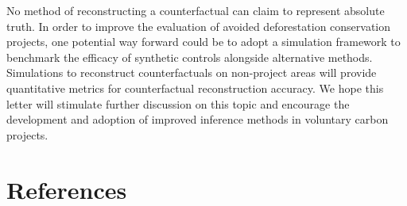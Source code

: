 \documentclass[
  number,
  3p]{elsarticle}
\begin{document}
No method of reconstructing a counterfactual can claim to represent
absolute truth. In order to improve the evaluation of avoided
deforestation conservation projects, one potential way forward could be
to adopt a simulation framework to benchmark the efficacy of synthetic
controls alongside alternative methods. Simulations to reconstruct
counterfactuals on non-project areas will provide quantitative metrics
for counterfactual reconstruction accuracy. We hope this letter will
stimulate further discussion on this topic and encourage the development
and adoption of improved inference methods in voluntary carbon projects.

\hypertarget{references}{%
\section{References}\label{references}}

\renewcommand{\bibsection}{}

\end{document}
